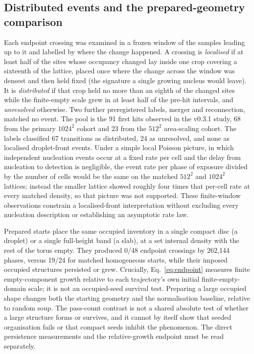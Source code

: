 \documentclass[11pt,a4paper]{article}
\begin{document}
\subsection{Distributed events and the prepared-geometry comparison}
Each endpoint crossing was examined in a frozen window of the samples leading up to it and labelled by where the change happened. A crossing is \emph{localised} if at least half of the sites whose occupancy changed lay inside one crop covering a sixteenth of the lattice, placed once where the change across the window was densest and then held fixed (the signature a single growing nucleus would leave). It is \emph{distributed} if that crop held no more than an eighth of the changed sites while the finite-empty scale grew in at least half of the pre-hit intervals, and \emph{unresolved} otherwise. Two further preregistered labels, merger and reconnection, matched no event. The pool is the 91 first hits observed in the v0.3.1 study, 68 from the primary $1024^2$ cohort and 23 from the $512^2$ area-scaling cohort. The labels classified 67 transitions as distributed, 24 as unresolved, and none as localised droplet-front events. Under a simple local Poisson picture, in which independent nucleation events occur at a fixed rate per cell and the delay from nucleation to detection is negligible, the event rate per phase of exposure divided by the number of cells would be the same on the matched $512^2$ and $1024^2$ lattices; instead the smaller lattice showed roughly four times that per-cell rate at every matched density, so that picture was not supported. These finite-window observations constrain a localised-front interpretation without excluding every nucleation description or establishing an asymptotic rate law.

Prepared starts place the same occupied inventory in a single compact disc (a droplet) or a single full-height band (a slab), at a set internal density with the rest of the torus empty. They produced 0/48 endpoint crossings by 262,144 phases, versus 19/24 for matched homogeneous starts, while their imposed occupied structures persisted or grew. Crucially, Eq.~\ref{eq:endpoint} measures finite empty-component growth relative to each trajectory's own initial finite-empty-domain scale; it is not an occupied-seed survival test. Preparing a large occupied shape changes both the starting geometry and the normalisation baseline, relative to random soup. The pass-count contrast is not a shared absolute test of whether a large structure forms or survives, and it cannot by itself show that seeded organisation fails or that compact seeds inhibit the phenomenon. The direct persistence measurements and the relative-growth endpoint must be read separately.
\end{document}
